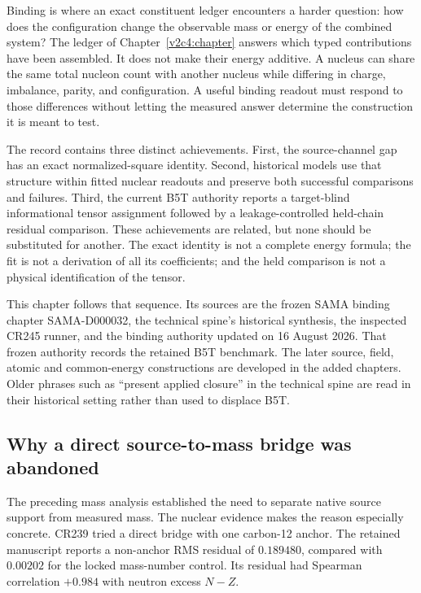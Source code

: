 \label{v2c5:chapter}

Binding is where an exact constituent ledger encounters a harder question: how does the configuration change the observable mass or energy of the combined system? The ledger of Chapter~\ref{v2c4:chapter} answers which typed contributions have been assembled. It does not make their energy additive. A nucleus can share the same total nucleon count with another nucleus while differing in charge, imbalance, parity, and configuration. A useful binding readout must respond to those differences without letting the measured answer determine the construction it is meant to test.

The record contains three distinct achievements. First, the source-channel gap has an exact normalized-square identity. Second, historical models use that structure within fitted nuclear readouts and preserve both successful comparisons and failures. Third, the current B5T authority reports a target-blind informational tensor assignment followed by a leakage-controlled held-chain residual comparison. These achievements are related, but none should be substituted for another. The exact identity is not a complete energy formula; the fit is not a derivation of all its coefficients; and the held comparison is not a physical identification of the tensor.

This chapter follows that sequence. Its sources are the frozen SAMA binding chapter SAMA-D000032, the technical spine's historical synthesis, the inspected CR245 runner, and the binding authority updated on 16 August 2026. That frozen authority records the retained B5T benchmark. The later source, field, atomic and common-energy constructions are developed in the added chapters. Older phrases such as ``present applied closure'' in the technical spine are read in their historical setting rather than used to displace B5T.\cite{viisama,viispine,viicr245,viibinding}

\subsection{Why a direct source-to-mass bridge was abandoned}
\label{v2c5:directfailure}

The preceding mass analysis established the need to separate native source support from measured mass. The nuclear evidence makes the reason especially concrete. CR239 tried a direct bridge with one carbon-12 anchor. The retained manuscript reports a non-anchor RMS residual of $0.189480$, compared with $0.00202$ for the locked mass-number control. Its residual had Spearman correlation $+0.984$ with neutron excess $N-Z$.\cite{viisama,viireview}

